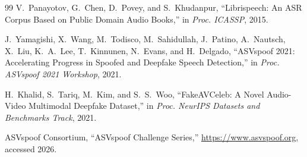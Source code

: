 \documentclass[11pt]{article}
\begin{document}
\begin{thebibliography}{99}
V.~Panayotov, G.~Chen, D.~Povey, and S.~Khudanpur,
``Librispeech: An ASR Corpus Based on Public Domain Audio Books,''
in \emph{Proc. ICASSP}, 2015.

J.~Yamagishi, X.~Wang, M.~Todisco, M.~Sahidullah, J.~Patino,
A.~Nautsch, X.~Liu, K.~A.~Lee, T.~Kinnunen, N.~Evans, and H.~Delgado,
``ASVspoof 2021: Accelerating Progress in Spoofed and Deepfake Speech
Detection,''
in \emph{Proc. ASVspoof 2021 Workshop}, 2021.

H.~Khalid, S.~Tariq, M.~Kim, and S.~S.~Woo,
``FakeAVCeleb: A Novel Audio-Video Multimodal Deepfake Dataset,''
in \emph{Proc. NeurIPS Datasets and Benchmarks Track}, 2021.

ASVspoof Consortium,
``ASVspoof Challenge Series,''
\url{https://www.asvspoof.org}, accessed 2026.

\end{thebibliography}
\end{document}
